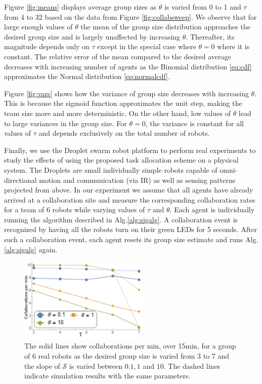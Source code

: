 \documentclass{svmult}  %
\newcommand{\sig}{\mathcal{S}}
\begin{document}
Figure \ref{fig:means} displays average group sizes as $\theta$ is varied from 0 to 1 and $\tau$ from 4 to 32 based on the data from Figure \ref{fig:collabsweep}. We observe that for large enough values of $\theta$ the mean of the group size distribution approaches the desired group size and is largely unaffected by increasing $\theta$. Thereafter, its magnitude depends only on $\tau$ except in the special case where $\theta = 0$ where it is constant. The relative error of the mean compared to the desired average decreases with increasing number of agents as the  Binomial distribution \eqref{eq:cdf}
approximates the Normal distribution \eqref{eq:normalcdf}.

Figure \ref{fig:vars} shows how the variance of group size decreases with increasing $\theta$. This is because the sigmoid function approximates the unit step, making the team size more and more deterministic. On the other hand, low values of $\theta$ lead to large variances in the group size. For $\theta=0$, the variance is constant for all values of $\tau$ and depends exclusively on the total number of robots. 

Finally, we use the Droplet swarm robot platform to perform real experiments to study the effects of using the proposed task allocation scheme on a physical system. The Droplets are small individually simple robots capable of omni-directional motion and communication (via IR) as well as sensing patterns projected from above. In our experiment we assume that all agents have already arrived at a collaboration site and measure the corresponding collaboration rates for a team of 6 robots while varying values of $\tau$ and $\theta$. Each agent is individually running the algorithm described in Alg.\ref{alg:sigalg}. A collaboration event is recognized by having all the robots turn on their green LEDs for 5 seconds. After such a collaboration event, each agent resets its group size estimate and runs Alg.\ref{alg:sigalg} again. 

\begin{figure}[!htb]
\centering\includegraphics[width=0.55\textwidth]{figures/realsimexpnew.png}
\caption{The solid lines show collaborations per min, over 15min, for a group of 6 real robots as the desired group size is varied from 3 to 7 and the slope of $\sig$ is varied between $0.1, 1$ and $10$. The dashed lines indicate simulation results with the same parameters.\label{fig:expdat} }
\end{figure}
\end{document}
